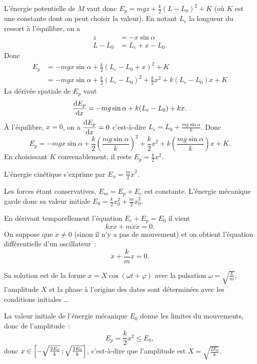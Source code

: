 L'énergie potentielle de \(M\) vaut donc \(E_p = mgz + \frac{k}{2}(L-L_0)^2 
+K\) (où \(K\) est une constante dont on peut choisir la valeur). En notant 
\(L_e\) la longueur du ressort à l'équilibre, on a
\begin{align}%
  z &= -x \sin \alpha \\
  L-L_0 &= L_e+x-L_0.
\end{align}%
Donc
\begin{align}%
  E_p &= -mgx \sin \alpha + \frac{k}{2}(L_e-L_0+x)^2 +K \\
  &= -mgx \sin \alpha + \frac{k}{2}(L_e-L_0)^2 +\frac{k}{2}x^2 + k(L_e-L_0)x+K
\end{align}%
La dérivée spatiale de \(E_p\) vaut
\begin{equation}%
  \derived{E_p}{x} = -mg\sin\alpha + k(L_e-L_0) + kx.
\end{equation}%
À l'équilibre, \(x=0\), on a \(\dfrac{\mathrm{d} E_p}{\mathrm{d} x}=0\) c'est-à-dire \(L_e = L_0 + 
\frac{mg\sin\alpha}{k}\). Donc
\begin{equation}%
  E_p = -mgx \sin \alpha + \frac{k}{2}\left(\frac{mg\sin\alpha}{k}\right)^2 
  +\frac{k}{2}x^2 + k\left(\frac{mg\sin\alpha}{k}\right)x+K.
\end{equation}%
En choisissant \(K\) convenablement, il reste \(E_p = \frac{k}{2}x^2\).

L'énergie cinétique s'exprime par \(E_x = \frac{m}{2} \dot{x}^2\).

Les forces étant conservatives, \(E_m=E_p+E_c\) est constante. L'énergie 
mécanique garde donc sa valeur initiale \(E_0=\frac{k}{2}x_0^2 + 
\frac{m}{2}\dot{x}_0^2\).

En dérivant temporellement l'équation \(E_c+E_p=E_0\) il vient
\begin{equation}%
  k x \dot{x} +m \dot{x}\ddot{x} =0.
\end{equation}%
On suppose que \(\dot{x} \neq 0\) (sinon il n'y a pas de mouvement) et on 
obtient l'équation différentielle d'un oscillateur~:
\begin{equation}%
  \ddot{x} + \frac{k}{m}x=0.
\end{equation}%

Sa solution est de la forme \(x=X\cos(\omega t +\varphi)\) avec la pulsation 
\(\omega = \sqrt{\frac{k}{m}}\), l'amplitude \(X\) et la phase à l'origine des 
dates sont déterminées avec les conditions initiales \ldots

La valeur initiale de l'énergie mécanique \(E_0\) donne les limites du 
mouvements, donc de l'amplitude~:
\begin{equation}%
  E_p=\frac{k}{2}x^2 \leq E_0,
\end{equation}%
donc \(x \in \left[ -\sqrt{\frac{2E_0}{k}} \, ;  \sqrt{\frac{2E_0}{k}} \right]\), 
c'est-à-dire que l'amplitude est \(X=\sqrt{\frac{2E_0}{k}}\).


